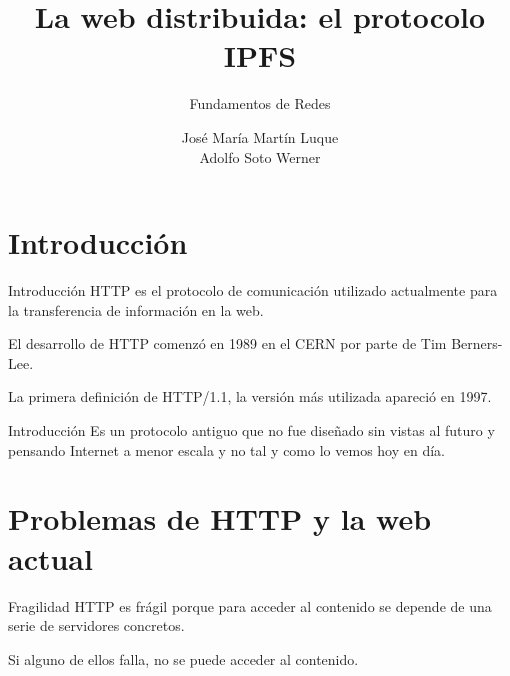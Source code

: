 \documentclass[spanish]{beamer}
\title{La web distribuida: el protocolo IPFS}
\subtitle{Fundamentos de Redes}
\author{José María Martín Luque\\ Adolfo Soto Werner}
\begin{document}
\maketitle

\section{Introducción} %
\label{sec:introducción}

\begin{frame}{Introducción}    
  HTTP es el protocolo de comunicación utilizado actualmente para la transferencia de información en la web.

  El desarrollo de HTTP comenzó en 1989 en el CERN por parte de Tim Berners-Lee.

  La primera definición de HTTP/1.1, la versión más utilizada apareció en 1997.
\end{frame}

\begin{frame}{Introducción}
  Es un protocolo antiguo que no fue diseñado sin vistas al futuro y pensando Internet a menor escala y no tal y como lo vemos hoy en día.
\end{frame}


\section{Problemas de HTTP y la web actual} %
\label{sec:problemas_de_http}

{
\begin{frame}[plain]
\end{frame}
}

\begin{frame}{Fragilidad}   
  HTTP es frágil porque para acceder al contenido se depende de una serie de servidores concretos.

  Si alguno de ellos falla, no se puede acceder al contenido.
\end{frame}
\end{document}
